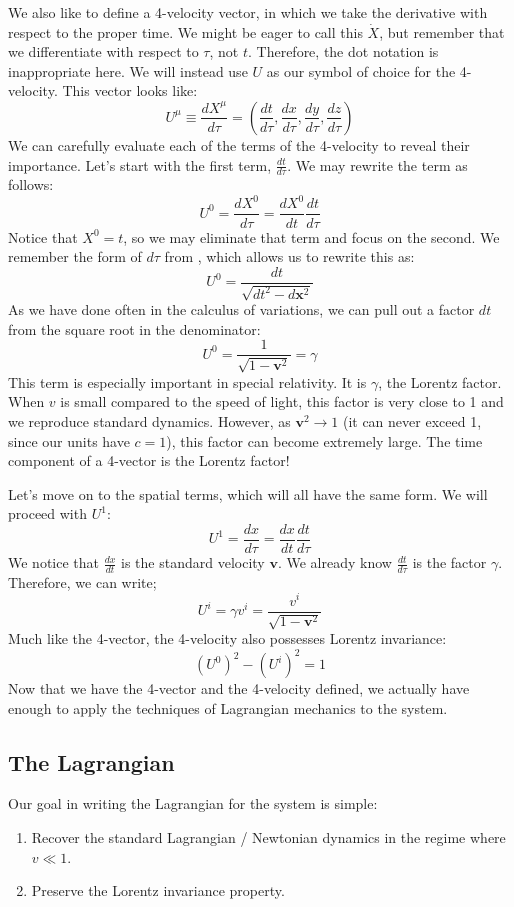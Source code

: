 We also like to define a 4-velocity vector, in which we take the derivative with respect to the proper time. We might be eager to call this $\dot{X}$, but remember that we differentiate with respect to $\tau$, not $t$. Therefore, the dot notation is inappropriate here. We will instead use $U$ as our symbol of choice for the 4-velocity. This vector looks like:
$$U^\mu\equiv\frac{d X^\mu}{d \tau}=\left(\frac{d t}{d\tau},\frac{d x}{d\tau},\frac{d y}{d\tau},\frac{d z}{d\tau}\right)$$
We can carefully evaluate each of the terms of the 4-velocity to reveal their importance. Let's start with the first term, $\frac{dt}{d \tau}$. We may rewrite the term as follows:
$$U^0=\frac{dX^0}{d\tau}=\frac{dX^0}{dt}\frac{dt}{d\tau}$$
Notice that $X^0=t$, so we may eliminate that term and focus on the second. We remember the form of $d\tau$ from , which allows us to rewrite this as:
$$U^0=\frac{dt}{\sqrt{dt^2-d\bm{x}^2}}$$
As we have done often in the calculus of variations, we can pull out a factor $dt$ from the square root in the denominator:
$$U^0=\frac{1}{\sqrt{1-\bm{v}^2}}=\gamma$$
This term is especially important in special relativity. It is $\gamma$, the Lorentz factor. When $v$ is small compared to the speed of light, this factor is very close to 1 and we reproduce standard dynamics. However, as $\bm{v}^2\rightarrow1$ (it can never exceed 1, since our units have $c=1$), this factor can become extremely large. The time component of a 4-vector is the Lorentz factor!

Let's move on to the spatial terms, which will all have the same form. We will proceed with $U^1$:
$$U^1=\frac{dx}{d\tau}=\frac{dx}{dt}\frac{dt}{d\tau}$$
We notice that $\frac{dx}{dt}$ is the standard velocity $\bm{v}$. We already know $\frac{dt}{d\tau}$ is the factor $\gamma$. Therefore, we can write;
$$U^i=\gamma v^i=\frac{v^i}{\sqrt{1-\bm{v}^2}}$$
Much like the 4-vector, the 4-velocity also possesses Lorentz invariance:
$$(U^0)^2-(U^i)^2=1$$
Now that we have the 4-vector and the 4-velocity defined, we actually have enough to apply the techniques of \gls{Lagrangian} mechanics to the system.
 
\subsection{The Lagrangian}

Our goal in writing the \gls{Lagrangian} for the system is simple:
\begin{enumerate}
    \item Recover the standard \gls{Lagrangian} / Newtonian dynamics in the regime where $v\ll1$.
    \item Preserve the Lorentz invariance property.
\end{enumerate}


